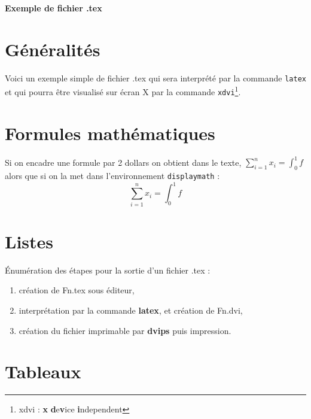 \documentclass[12pt]{article}    %
\newcommand{\largtt}[1]{{\large\texttt{#1}}}             %
\begin{document}
\parskip 5pt                                             %

\begin{center}
\LARGE\bfseries Exemple de fichier .tex                  %
\end{center}

\section{G\'en\'eralit\'es}                              %

Voici un exemple simple de fichier .tex qui sera interpr\'et\'e
par la commande \largtt{latex} et qui pourra \^etre visualis\'e sur 
\'ecran X par la commande \largtt{xdvi}\footnote{xdvi : {\bfseries x} 
{\bfseries d}e{\bfseries v}ice {\bfseries i}ndependent}.                   

\section{Formules math\'ematiques}                       %

Si on encadre une formule par 2 dollars on obtient dans le texte,
$\sum_{i=1}^{n} x_{i} = \int_{0}^{1} f$ alors que si on la met dans
l'environnement \texttt{displaymath} : 
\begin{displaymath}
\sum_{i=1}^{n} x_{i} = \int_{0}^{1} f
\end{displaymath}

\section{Listes}                                         %

\'Enum\'eration des \'etapes pour la sortie d'un fichier .tex : 
\begin{enumerate}
\item cr\'eation de Fn.tex sous \'editeur,
\item interpr\'etation par la commande {\bfseries latex}, 
      et cr\'eation de Fn.dvi,
\item cr\'eation du fichier imprimable par {\bfseries dvips} puis impression.
\end{enumerate}

\section{Tableaux}                                       %
\end{document}
